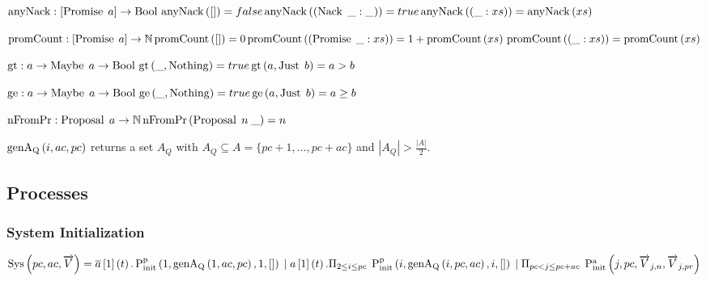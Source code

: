 $\operatorname{anyNack} : [\operatorname{Promise}\; a] \to \operatorname{Bool}\\
\operatorname{anyNack}\left([]\right) = false\\
\operatorname{anyNack}\left((\operatorname{Nack}\; \_: \_)\right) = true\\
\operatorname{anyNack}\left((\_:xs)\right) = \operatorname{anyNack}\left(xs\right)$

$\operatorname{promCount} : [\operatorname{Promise}\; a] \to \mathbb{N}\\
\operatorname{promCount}\left([]\right) = 0\\
\operatorname{promCount}\left((\operatorname{Promise}\; \_:xs)\right) = 1 + \operatorname{promCount}\left(xs\right)\\
\operatorname{promCount}\left((\_:xs)\right) = \operatorname{promCount}\left(xs\right)$

$\operatorname{gt}: a \to \operatorname{Maybe}\; a \to \operatorname{Bool}\\
\operatorname{gt}\left(\_, \operatorname{Nothing}\right) = true\\
\operatorname{gt}\left(a, \operatorname{Just}\; b\right) = a > b$

$\operatorname{ge}: a \to \operatorname{Maybe}\; a \to \operatorname{Bool}\\
\operatorname{ge}\left(\_, \operatorname{Nothing}\right) = true\\
\operatorname{ge}\left(a, \operatorname{Just}\; b\right) = a \ge b$

$\operatorname{nFromPr} : \operatorname{Proposal}\; a \to \mathbb{N}\\
\operatorname{nFromPr}\left(\operatorname{Proposal}\; n\; \_ \right) = n$

$\operatorname{genA_Q}\left(i, ac, pc\right)$ returns a set $A_Q$ with $A_Q \subseteq A = \{pc + 1, \dots, pc + ac\}$ and $|A_Q| > \frac{|A|}{2}$.

\subsection{Processes}
\newcommand{\Sys}[3]{\operatorname{Sys}\left(#1, #2, #3\right)}
\newcommand{\Pa}[0]{\operatorname{P^a}}
\newcommand{\Pp}[0]{\operatorname{P^p}}
\newcommand{\PaCont}[0]{\operatorname{P^a_{cont}}}

\newcommand{\PpInit}[4]{\operatorname{P^p_{init}}\left(#1, #2, #3, #4\right)}
\newcommand{\PaInit}[4]{\operatorname{P^a_{init}}\left(#1, #2, #3, #4\right)}

\subsubsection{System Initialization}
\newcommand{\SessionRequest}[3]{\overline{#1}\left[#2\right]\left(#3\right)}
\newcommand{\SessionAccept}[3]{#1\left[#2\right]\left(#3\right)}
\newcommand{\ParallelFor}[1]{\Pi_{#1}\;}

$\Sys{pc}{ac}{\overrightarrow{V}} = \SessionRequest{a}{1}{t} . \PpInit{1}{\genAq{1}{ac}{pc}}{1}{[]}\\
\Or \SessionAccept{a}{1}{t} . \ParallelFor{2 \le i \le pc} \PpInit{i}{\genAq{i}{pc}{ac}}{i}{[]} \\
\Or \ParallelFor{pc < j \le pc + ac} \PaInit{j}{pc}{\overrightarrow{V}_{j,n}}{\overrightarrow{V}_{j,pr}}$

